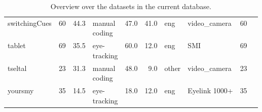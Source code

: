 \documentclass{article}
\begin{document}
\begin{table}[ht!]
\begin{tabular}{lrrlrrllrr}
  switchingCues & 60 & 44.3 & \thead{manual  \\ coding} & 47.0 & 41.0 & eng & video\_camera & 60 \\ 
  tablet & 69 & 35.5 & \thead{eye-\\tracking}  & 60.0 & 12.0 & eng & SMI & 69 \\ 
  tseltal & 23 & 31.3 & \thead{manual  \\ coding} & 48.0 & 9.0 & other &  video\_camera & 23\\ 
  yoursmy & 35 & 14.5 & \thead{eye-\\tracking}  & 18.0 & 12.0 & eng & Eyelink 1000+ & 35 \\ 
   \hline
\end{tabular}
\caption{Overview over the datasets in the current database.} 
\end{table}
\end{document}
